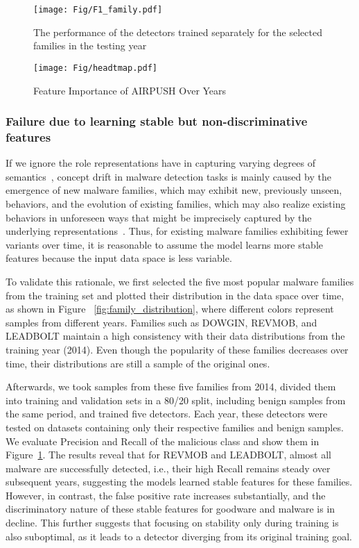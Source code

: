 \begin{figure}
    \centering
    \setlength{\abovecaptionskip}{0.3cm}
    \texttt{[image: Fig/F1\_family.pdf]}
    \caption{The performance of the detectors trained separately for the selected families in the testing year}
    \label{fig:f1_family}
\end{figure}

\begin{figure}
    \centering
    \setlength{\abovecaptionskip}{0.cm}
    \texttt{[image: Fig/headtmap.pdf]}
    \caption{Feature Importance of AIRPUSH Over Years}
    \label{fig:heatmap}
\end{figure}

\subsubsection{Failure due to learning stable but non-discriminative features}
\label{discriminative features}
If we ignore the role representations have in capturing varying degrees of semantics~\cite{pei2024exploiting}, concept drift in malware detection tasks is mainly caused by the emergence of new malware families, which may exhibit new, previously unseen, behaviors, and the evolution of existing families, which may also realize existing behaviors in unforeseen ways that might be imprecisely captured by the underlying representations~\cite{pei2024exploiting}. Thus, for existing malware families exhibiting fewer variants over time, it is reasonable to assume the model learns more stable features because the input data space is less variable.

To validate this rationale, we first selected the five most popular malware families from the training set and plotted their distribution in the data space over time, as shown in Figure ~\ref{fig:family_distribution}, where different colors represent samples from different years. Families such as DOWGIN, REVMOB, and LEADBOLT maintain a high consistency with their data distributions from the training year (2014). Even though the popularity of these families decreases over time, their distributions are still a sample of the original ones.

Afterwards, we took samples from these five families from 2014, divided them into training and validation sets in a 80/20 split, including benign samples from the same period, and trained five detectors. Each year, these detectors were tested on datasets containing only their respective families and benign samples. We evaluate Precision and Recall of the malicious class and show them in Figure~\ref{fig:f1_family}. The results reveal that for REVMOB and LEADBOLT, almost all malware are successfully detected, i.e., their high Recall remains steady over subsequent years, suggesting the models learned stable features for these families. However, in contrast, the false positive rate increases substantially, and the discriminatory nature of these stable features for goodware and malware is in decline. This further suggests that focusing on stability only during training is also suboptimal, as it leads to a detector diverging from its original training goal.


